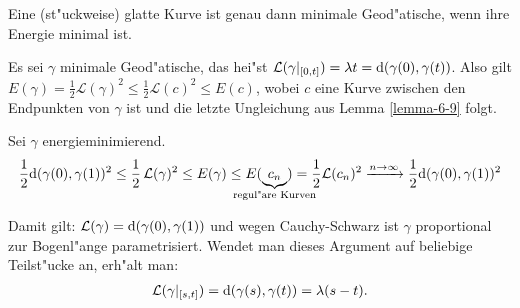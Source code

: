 \begin{Satz}
  Eine (st"uckweise) glatte Kurve ist genau dann minimale Geod"atische, wenn ihre Energie minimal ist.
\end{Satz}

\begin{bew}\begin{description}[font=\normalfont]
\item[\quot{$\Rightarrow$}:]
	Es sei $\gamma$ minimale Geod"atische, das hei"st $\mathcal L(\gamma|_{[0,t]}) = \lambda t = \mathrm{d} (\gamma(0),\gamma(t))$.
	Also gilt $E(\gamma) = \frac{1}2 \mathcal L(\gamma)^2 \leq \frac{1}2 \mathcal L(c)^2 \leq E(c)$, wobei $c$ eine Kurve zwischen den Endpunkten von $\gamma$ ist und die letzte Ungleichung aus Lemma \ref{lemma-6-9} folgt.
\item[\quot{$\Leftarrow$}:]
	Sei $\gamma$ energieminimierend.
	\begin{align*}
		\frac{1}2 \dop (\gamma(0), \gamma(1))^2 \leq \frac{1}2 \calL(\gamma)^2 \leq E(\gamma) \leq E(\underbrace{c_n}_{\mathclap{\text{regul"are Kurven}}}) = \frac{1}2 \mathcal L(c_n)^2 \xrightarrow{n\to\infty} \frac{1}2 \dop(\gamma(0),\gamma(1))^2
	\end{align*}
	\begin{center}\end{center}

	Damit gilt: $\mathcal L(\gamma) = \mathrm{d}(\gamma(0),\gamma(1))$ und wegen Cauchy-Schwarz ist $\gamma$ proportional zur Bogenl"ange parametrisiert.
	Wendet man dieses Argument auf beliebige Teilst"ucke an, erh"alt man:
	\begin{align*}
		\mathcal L(\gamma|_{[s,t]}) = \mathrm{d}(\gamma(s),\gamma(t)) = \lambda(s-t).
	\end{align*}
\end{description}\end{bew}

